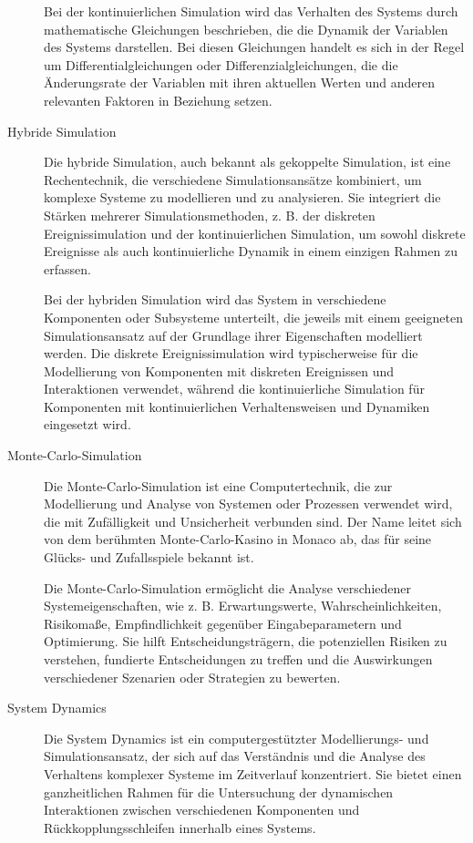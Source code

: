 \begin{description}
    Bei der kontinuierlichen Simulation wird das Verhalten des Systems durch mathematische Gleichungen beschrieben, die die Dynamik der Variablen des Systems darstellen. Bei diesen Gleichungen handelt es sich in der Regel um Differentialgleichungen oder Differenzialgleichungen, die die Änderungsrate der Variablen mit ihren aktuellen Werten und anderen relevanten Faktoren in Beziehung setzen.
    \cite[vgl.][]{mattern-diskrete-simulation}

    \item[Hybride Simulation] 
    Die hybride Simulation, auch bekannt als gekoppelte Simulation, ist eine Rechentechnik, die verschiedene Simulationsansätze kombiniert, um komplexe Systeme zu modellieren und zu analysieren. Sie integriert die Stärken mehrerer Simulationsmethoden, z. B. der diskreten Ereignissimulation und der kontinuierlichen Simulation, um sowohl diskrete Ereignisse als auch kontinuierliche Dynamik in einem einzigen Rahmen zu erfassen.

    Bei der hybriden Simulation wird das System in verschiedene Komponenten oder Subsysteme unterteilt, die jeweils mit einem geeigneten Simulationsansatz auf der Grundlage ihrer Eigenschaften modelliert werden. Die diskrete Ereignissimulation wird typischerweise für die Modellierung von Komponenten mit diskreten Ereignissen und Interaktionen verwendet, während die kontinuierliche Simulation für Komponenten mit kontinuierlichen Verhaltensweisen und Dynamiken eingesetzt wird.

    \item[Monte-Carlo-Simulation] 
    Die Monte-Carlo-Simulation ist eine Computertechnik, die zur Modellierung und Analyse von Systemen oder Prozessen verwendet wird, die mit Zufälligkeit und Unsicherheit verbunden sind. Der Name leitet sich von dem berühmten Monte-Carlo-Kasino in Monaco ab, das für seine Glücks- und Zufallsspiele bekannt ist.

    Die Monte-Carlo-Simulation ermöglicht die Analyse verschiedener Systemeigenschaften, wie z. B. Erwartungswerte, Wahrscheinlichkeiten, Risikomaße, Empfindlichkeit gegenüber Eingabeparametern und Optimierung. Sie hilft Entscheidungsträgern, die potenziellen Risiken zu verstehen, fundierte Entscheidungen zu treffen und die Auswirkungen verschiedener Szenarien oder Strategien zu bewerten.
    \cite[vgl.][]{monte-carlo-sim}

    \item[System Dynamics] 
    Die System Dynamics ist ein computergestützter Modellierungs- und Simulationsansatz, der sich auf das Verständnis und die Analyse des Verhaltens komplexer Systeme im Zeitverlauf konzentriert. Sie bietet einen ganzheitlichen Rahmen für die Untersuchung der dynamischen Interaktionen zwischen verschiedenen Komponenten und Rückkopplungsschleifen innerhalb eines Systems.


\end{description}
